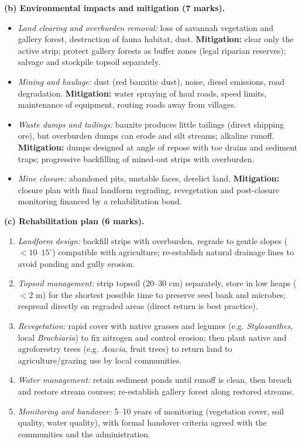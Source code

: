 \documentclass[11pt]{article}
\begin{document}
\begin{corrige}
\textbf{(b) Environmental impacts and mitigation (7 marks).}
\begin{itemize}
\item \emph{Land clearing and overburden removal:} loss of savannah vegetation and gallery forest, destruction of fauna habitat, dust. \textbf{Mitigation:} clear only the active strip; protect gallery forests as buffer zones (legal riparian reserves); salvage and stockpile topsoil separately.
\item \emph{Mining and haulage:} dust (red bauxitic dust), noise, diesel emissions, road degradation. \textbf{Mitigation:} water spraying of haul roads, speed limits, maintenance of equipment, routing roads away from villages.
\item \emph{Waste dumps and tailings:} bauxite produces little tailings (direct shipping ore), but overburden dumps can erode and silt streams; alkaline runoff. \textbf{Mitigation:} dumps designed at angle of repose with toe drains and sediment traps; progressive backfilling of mined-out strips with overburden.
\item \emph{Mine closure:} abandoned pits, unstable faces, derelict land. \textbf{Mitigation:} closure plan with final landform regrading, revegetation and post-closure monitoring financed by a rehabilitation bond.
\end{itemize}

\textbf{(c) Rehabilitation plan (6 marks).}
\begin{enumerate}
\item \emph{Landform design:} backfill strips with overburden, regrade to gentle slopes ($< 10$--$15^\circ$) compatible with agriculture; re-establish natural drainage lines to avoid ponding and gully erosion.
\item \emph{Topsoil management:} strip topsoil ($20$--$30$ cm) separately, store in low heaps ($< 2$ m) for the shortest possible time to preserve seed bank and microbes; respread directly on regraded areas (direct return is best practice).
\item \emph{Revegetation:} rapid cover with native grasses and legumes (e.g. \emph{Stylosanthes}, local \emph{Brachiaria}) to fix nitrogen and control erosion; then plant native and agroforestry trees (e.g. \emph{Acacia}, fruit trees) to return land to agriculture/grazing use by local communities.
\item \emph{Water management:} retain sediment ponds until runoff is clean, then breach and restore stream courses; re-establish gallery forest along restored streams.
\item \emph{Monitoring and handover:} 5--10 years of monitoring (vegetation cover, soil quality, water quality), with formal handover criteria agreed with the communities and the administration.
\end{enumerate}


\end{corrige}
\end{document}
